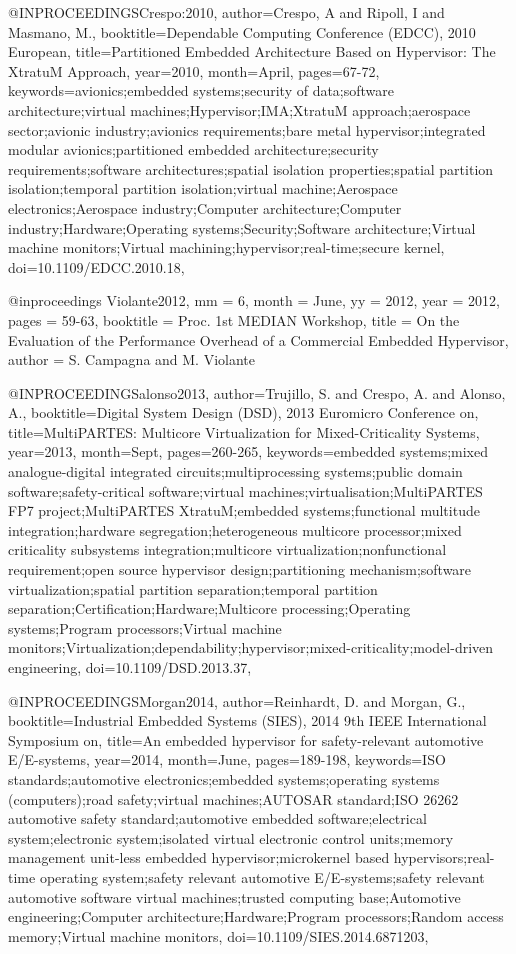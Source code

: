 @INPROCEEDINGS{Crespo:2010, 
author={Crespo, A and Ripoll, I and Masmano, M.}, 
booktitle={Dependable Computing Conference (EDCC), 2010 European}, 
title={Partitioned Embedded Architecture Based on Hypervisor: The XtratuM Approach}, 
year={2010}, 
month={April}, 
pages={67-72}, 
keywords={avionics;embedded systems;security of data;software architecture;virtual machines;Hypervisor;IMA;XtratuM approach;aerospace sector;avionic industry;avionics requirements;bare metal hypervisor;integrated modular avionics;partitioned embedded architecture;security requirements;software architectures;spatial isolation properties;spatial partition isolation;temporal partition isolation;virtual machine;Aerospace electronics;Aerospace industry;Computer architecture;Computer industry;Hardware;Operating systems;Security;Software architecture;Virtual machine monitors;Virtual machining;hypervisor;real-time;secure kernel}, 
doi={10.1109/EDCC.2010.18},}

@inproceedings {Violante2012,
  mm = {6}, 
  month = {June}, 
  yy = {2012}, 
  year = {2012}, 
  pages = {59-63}, 
  booktitle = {Proc. 1st MEDIAN Workshop}, 
  title = {On the Evaluation of the Performance Overhead of a Commercial Embedded Hypervisor}, 
  author = {S. Campagna and M. Violante} }

@INPROCEEDINGS{alonso2013, 
author={Trujillo, S. and Crespo, A. and Alonso, A.}, 
booktitle={Digital System Design (DSD), 2013 Euromicro Conference on}, 
title={MultiPARTES: Multicore Virtualization for Mixed-Criticality Systems}, 
year={2013}, 
month={Sept}, 
pages={260-265}, 
keywords={embedded systems;mixed analogue-digital integrated circuits;multiprocessing systems;public domain software;safety-critical software;virtual machines;virtualisation;MultiPARTES FP7 project;MultiPARTES XtratuM;embedded systems;functional multitude integration;hardware segregation;heterogeneous multicore processor;mixed criticality subsystems integration;multicore virtualization;nonfunctional requirement;open source hypervisor design;partitioning mechanism;software virtualization;spatial partition separation;temporal partition separation;Certification;Hardware;Multicore processing;Operating systems;Program processors;Virtual machine monitors;Virtualization;dependability;hypervisor;mixed-criticality;model-driven engineering}, 
doi={10.1109/DSD.2013.37},}


@INPROCEEDINGS{Morgan2014, 
author={Reinhardt, D. and Morgan, G.}, 
booktitle={Industrial Embedded Systems (SIES), 2014 9th IEEE International Symposium on}, 
title={An embedded hypervisor for safety-relevant automotive E/E-systems}, 
year={2014}, 
month={June}, 
pages={189-198}, 
keywords={ISO standards;automotive electronics;embedded systems;operating systems (computers);road safety;virtual machines;AUTOSAR standard;ISO 26262 automotive safety standard;automotive embedded software;electrical system;electronic system;isolated virtual electronic control units;memory management unit-less embedded hypervisor;microkernel based hypervisors;real-time operating system;safety relevant automotive E/E-systems;safety relevant automotive software virtual machines;trusted computing base;Automotive engineering;Computer architecture;Hardware;Program processors;Random access memory;Virtual machine monitors}, 
doi={10.1109/SIES.2014.6871203},}


